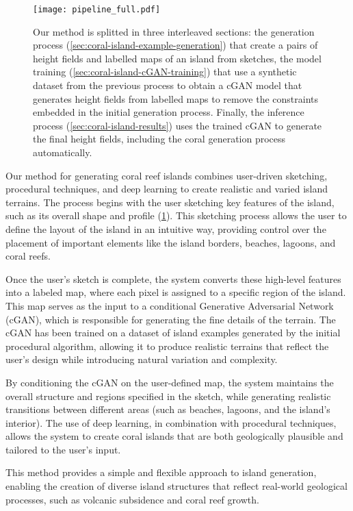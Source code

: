 \begin{figure}[H]
    \texttt{[image: pipeline\_full.pdf]}
    \caption{Our method is splitted in three interleaved sections: the generation process (\cref{sec:coral-island-example-generation}) that create a pairs of height fields and labelled maps of an island from sketches, the model training (\cref{sec:coral-island-cGAN-training}) that use a synthetic dataset from the previous process to obtain a cGAN model that generates height fields from labelled maps to remove the constraints embedded in the initial generation process. Finally, the inference process (\cref{sec:coral-island-results}) uses the trained cGAN to generate the final height fields, including the coral generation process automatically. }
    \label{fig:coral-island-pipeline}
\end{figure}
Our method for generating coral reef islands combines user-driven sketching, procedural techniques, and deep learning to create realistic and varied island terrains. The process begins with the user sketching key features of the island, such as its overall shape and profile (\cref{fig:coral-island-pipeline}). This sketching process allows the user to define the layout of the island in an intuitive way, providing control over the placement of important elements like the island borders, beaches, lagoons, and coral reefs.

Once the user's sketch is complete, the system converts these high-level features into a labeled map, where each pixel is assigned to a specific region of the island. This map serves as the input to a conditional Generative Adversarial Network (cGAN), which is responsible for generating the fine details of the terrain. The cGAN has been trained on a dataset of island examples generated by the initial procedural algorithm, allowing it to produce realistic terrains that reflect the user's design while introducing natural variation and complexity.

By conditioning the cGAN on the user-defined map, the system maintains the overall structure and regions specified in the sketch, while generating realistic transitions between different areas (such as beaches, lagoons, and the island's interior). The use of deep learning, in combination with procedural techniques, allows the system to create coral islands that are both geologically plausible and tailored to the user's input.

This method provides a simple and flexible approach to island generation, enabling the creation of diverse island structures that reflect real-world geological processes, such as volcanic subsidence and coral reef growth.



